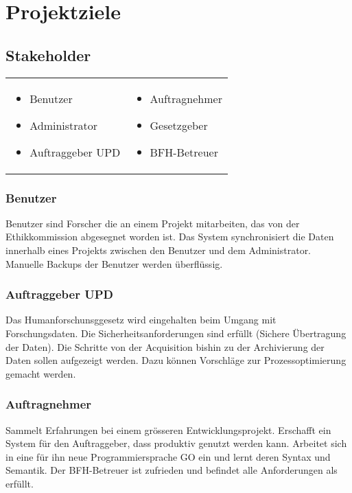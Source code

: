 \chapter{Projektziele}

\section{Stakeholder}

\begin{tabular}{ll}
 \parbox{5cm}{
 \begin{itemize}
  \item Benutzer
  \item Administrator
  \item Auftraggeber UPD
 \end{itemize}}
 &
 \parbox{5cm}{
 \begin{itemize}
  \item Auftragnehmer
  \item Gesetzgeber
  \item BFH-Betreuer
 \end{itemize}}

\end{tabular}

\subsection{Benutzer}
Benutzer sind Forscher die an einem Projekt mitarbeiten, das von der Ethikkommission abgesegnet worden ist. Das System synchronisiert die Daten innerhalb eines Projekts zwischen den Benutzer und dem Administrator. Manuelle Backups der Benutzer werden überflüssig.

\subsection{Auftraggeber UPD}
Das Humanforschunsggesetz wird eingehalten beim Umgang mit Forschungsdaten. Die Sicherheitsanforderungen sind erfüllt (Sichere Übertragung der Daten). Die Schritte von der Acquisition bishin zu der Archivierung der Daten sollen aufgezeigt werden. Dazu können Vorschläge zur Prozessoptimierung gemacht werden.

\subsection{Auftragnehmer}
Sammelt Erfahrungen bei einem grösseren Entwicklungsprojekt. Erschafft ein System für den Auftraggeber, dass produktiv genutzt werden kann. Arbeitet sich in eine für ihn neue Programmiersprache GO ein und lernt deren Syntax und Semantik.
Der BFH-Betreuer ist zufrieden und befindet alle Anforderungen als erfüllt.


